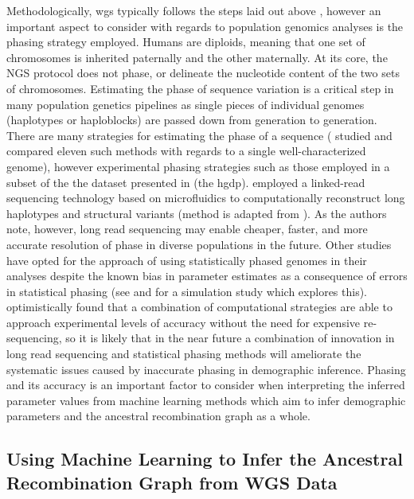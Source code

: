 Methodologically, \gls{wgs} typically follows the steps laid out above , however an important aspect to consider with regards to population genomics analyses is the phasing strategy employed. Humans are diploids, meaning that one set of chromosomes is inherited paternally and the other maternally. At its core, the NGS protocol does not phase, or delineate the nucleotide content of the two sets of chromosomes. Estimating the phase of sequence variation is a critical step in many population genetics pipelines as single pieces of individual genomes (haplotypes or haploblocks) are passed down from generation to generation. There are many strategies for estimating the phase of a sequence (\textcite{Choi2018} studied and compared eleven such methods with regards to a single well-characterized genome), however experimental phasing strategies such as those employed in a subset of the the dataset presented in \textcite{Bergstrom2019} (the \gls{hgdp}). \textcite{Bergstrom2019} employed a linked-read sequencing technology based on microfluidics to computationally reconstruct long haplotypes and structural variants (method is adapted from \cite{GX2016}). As the authors note, however, long read sequencing may enable cheaper, faster, and more accurate resolution of phase in diverse populations in the future. Other studies have opted for the approach of using statistically phased genomes in their analyses despite the known bias in parameter estimates as a consequence of errors in statistical phasing (see \textcite[Supplemental section 7]{Steinrucken2019} and \textcite{Raghavan2015a} for a simulation study which explores this). \textcite{Choi2018} optimistically found that a combination of computational strategies are able to approach experimental levels of accuracy without the need for expensive re-sequencing, so it is likely that in the near future a combination of innovation in long read sequencing and statistical phasing methods will ameliorate the systematic issues caused by inaccurate phasing in demographic inference. Phasing and its accuracy is an important factor to consider when interpreting the inferred parameter values from machine learning methods which aim to infer demographic parameters and the ancestral recombination graph as a whole.

\subsection{Using Machine Learning to Infer the Ancestral Recombination Graph from WGS Data}

